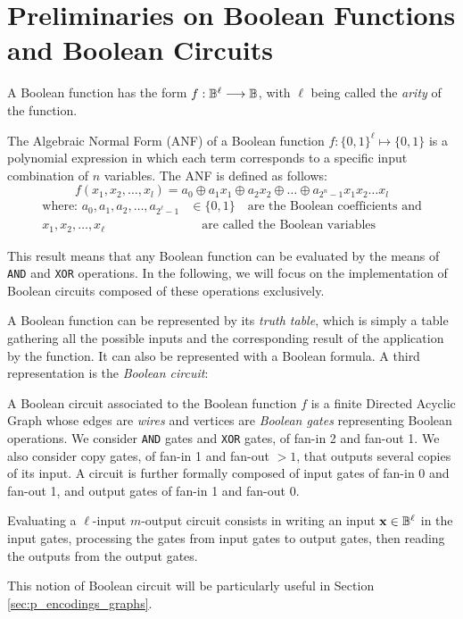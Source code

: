 \section{Preliminaries on Boolean Functions and Boolean Circuits}
\label{sec:p_encodings_preliminaries_boolean}


A Boolean function has the form $f: \mathbb{B}^\ell \longrightarrow \mathbb{B}$, with $\ell$ being called the \emph{arity} of the function. 

\begin{definition}
    
The Algebraic Normal Form (ANF) of a Boolean function $f: \{0,1\}^\ell \mapsto \{0,1\}$ is a polynomial expression in which each term corresponds to a specific input combination of $n$ variables. The ANF is defined as follows: \[f(x_1, x_2, \ldots, x_l) = a_0 \oplus a_1x_1 \oplus a_2x_2 \oplus \ldots \oplus a_{2^n-1}x_1x_2\ldots x_l\] \begin{align*}
\text{where: }a_0, a_1, a_2, \ldots, a_{2^\ell-1} & \in \{0,1\} \quad \text{are the Boolean coefficients and} \\
x_1, x_2, \ldots, x_\ell & \quad \text{are called the Boolean variables}
\end{align*}
\end{definition}

This result means that any Boolean function can be evaluated by the means of \texttt{AND} and \texttt{XOR} operations. In the following, we will focus on the implementation of Boolean circuits composed of these operations exclusively.


A Boolean function can be represented by its \emph{truth table}, which is simply a table gathering all the possible inputs and the corresponding result of the application by the function. It can also be represented with a Boolean formula. A third representation is the \emph{Boolean circuit}:

\begin{definition}
    A Boolean circuit associated to the Boolean function $f$ is a finite Directed Acyclic Graph whose edges are \emph{wires} and vertices are \emph{Boolean gates} representing Boolean operations. We consider \texttt{AND} gates and \texttt{XOR} gates, of fan-in 2 and fan-out 1. We also consider copy gates, of fan-in 1 and fan-out $>1$, that outputs several copies of its input. A circuit is further formally composed of input gates of fan-in 0 and fan-out 1, and output gates of fan-in 1 and fan-out 0.
    
    Evaluating a $\ell$-input $m$-output circuit consists in writing an input $\mathbf{x} \in \mathbb{B}^\ell$ in the input gates, processing the gates from input gates to output gates, then reading the outputs from the output gates.

\end{definition}


This notion of Boolean circuit will be particularly useful in Section \ref{sec:p_encodings_graphs}.

